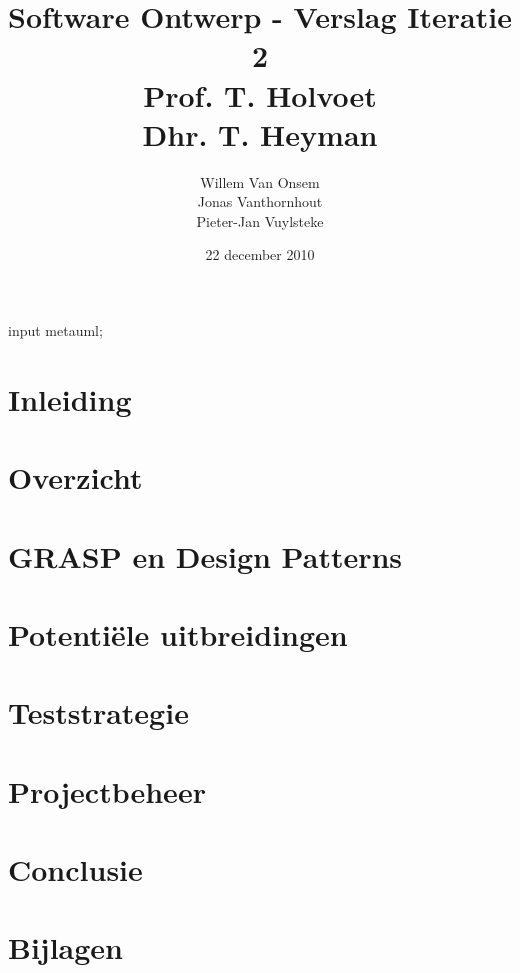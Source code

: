 \documentclass[a4paper,titlepage]{article}
\title{Software Ontwerp - Verslag Iteratie 2\\Prof. T. Holvoet\\Dhr. T. Heyman}
\author{Willem Van Onsem\\Jonas Vanthornhout\\Pieter-Jan Vuylsteke}
\date{22 december 2010}
\begin{document}
\begin{empfile}
\begin{empcmds}
input metauml;
\end{empcmds}
\begin{titlepage}
\maketitle
\end{titlepage}
\tableofcontents
\newpage
\section*{Inleiding}

\newpage
\section{Overzicht}

\newpage
\section{GRASP en Design Patterns}

\newpage
\section{Potenti\"ele uitbreidingen}

\newpage
\section{Teststrategie}

\newpage
\section{Projectbeheer}

\newpage
\section{Conclusie}

\newpage
\appendix
\section{Bijlagen}


\end{empfile}
\end{document}
